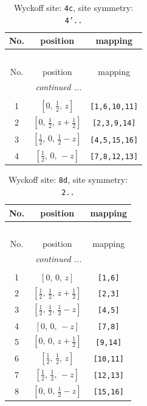 \documentclass[fleqn,8pt]{jsarticle}
\begin{document}
\renewcommand{\arraystretch}{1.2}
\begin{longtable}{ccc}
\caption{Wyckoff site: {\tt 4c}, site symmetry: {\tt 4'..}}
 \\
 \hline \hline
No. & position & mapping \\ \hline \endfirsthead

\multicolumn{2}{l}{\tablename\ \thetable{}} \\
 \hline \hline
No. & position & mapping \\ \hline \endhead

 \hline \hline
\multicolumn{2}{r}{\footnotesize\it continued ...} \\ \endfoot

 \hline \hline
\multicolumn{2}{r}{} \\ \endlastfoot

1 & $\left[ 0,\, \frac{1}{2},\, z \right]$ & {\tt [1,6,10,11]} \\ \hline
2 & $\left[ 0,\, \frac{1}{2},\, z + \frac{1}{2} \right]$ & {\tt [2,3,9,14]} \\ \hline
3 & $\left[ \frac{1}{2},\, 0,\, \frac{1}{2} - z \right]$ & {\tt [4,5,15,16]} \\ \hline
4 & $\left[ \frac{1}{2},\, 0,\, - z \right]$ & {\tt [7,8,12,13]} \\
\end{longtable}
\renewcommand{\arraystretch}{1.2}
\begin{longtable}{ccc}
\caption{Wyckoff site: {\tt 8d}, site symmetry: {\tt 2..}}
 \\
 \hline \hline
No. & position & mapping \\ \hline \endfirsthead

\multicolumn{2}{l}{\tablename\ \thetable{}} \\
 \hline \hline
No. & position & mapping \\ \hline \endhead

 \hline \hline
\multicolumn{2}{r}{\footnotesize\it continued ...} \\ \endfoot

 \hline \hline
\multicolumn{2}{r}{} \\ \endlastfoot

1 & $\left[ 0,\, 0,\, z \right]$ & {\tt [1,6]} \\ \hline
2 & $\left[ \frac{1}{2},\, \frac{1}{2},\, z + \frac{1}{2} \right]$ & {\tt [2,3]} \\ \hline
3 & $\left[ \frac{1}{2},\, \frac{1}{2},\, \frac{1}{2} - z \right]$ & {\tt [4,5]} \\ \hline
4 & $\left[ 0,\, 0,\, - z \right]$ & {\tt [7,8]} \\ \hline
5 & $\left[ 0,\, 0,\, z + \frac{1}{2} \right]$ & {\tt [9,14]} \\ \hline
6 & $\left[ \frac{1}{2},\, \frac{1}{2},\, z \right]$ & {\tt [10,11]} \\ \hline
7 & $\left[ \frac{1}{2},\, \frac{1}{2},\, - z \right]$ & {\tt [12,13]} \\ \hline
8 & $\left[ 0,\, 0,\, \frac{1}{2} - z \right]$ & {\tt [15,16]} \\
\end{longtable}
\end{document}
